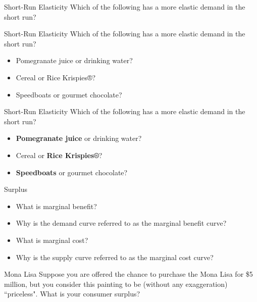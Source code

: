 \documentclass{beamer}
\begin{document}
\begin{frame}[t]{Short-Run Elasticity}
    Which of the following has a more elastic demand in the short run?
\end{frame}

\begin{frame}[t]{Short-Run Elasticity}
    Which of the following has a more elastic demand in the short run?
    \begin{itemize}
        \item Pomegranate juice or drinking water?
        \item Cereal or Rice Krispies®?
        \item Speedboats or gourmet chocolate?
    \end{itemize}
\end{frame}

\begin{frame}[t]{Short-Run Elasticity}
    Which of the following has a more elastic demand in the short run?
    \begin{itemize}
        \item \textbf{Pomegranate juice} or drinking water?
        \item Cereal or \textbf{Rice Krispies®}?
        \item \textbf{Speedboats} or gourmet chocolate?
    \end{itemize}
\end{frame}

\begin{frame}{Surplus}
    \begin{itemize}
        \item What is marginal benefit?
        \item Why is the demand curve referred to as the marginal benefit curve?
        \item What is marginal cost?
        \item Why is the supply curve referred to as the marginal cost curve?
    \end{itemize}
\end{frame}

\begin{frame}[t]{Mona Lisa}
    Suppose you are offered the chance to purchase the Mona Lisa for \$5 million, but you consider this painting to be (without any exaggeration) ``priceless". What is your consumer surplus?
\end{frame}
\end{document}
